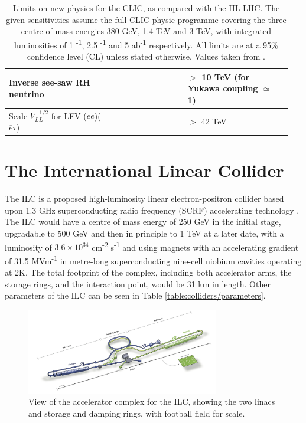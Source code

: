 \begin{table}[b]
\begin{tabular}{p{0.35\linewidth}  p{0.25\linewidth} p{0.35\linewidth}}
	Inverse see-saw RH neutrino &  & $>$ 10 TeV (for Yukawa coupling $\simeq$ 1) \\ \hline

	Scale $V^{-1/2}_{LL}$ for LFV ($\overline{e}e$)($\overline{e}\tau$) & & $>$ 42 TeV \\ \hline \hline
	\end{tabular}
	\caption{Limits on new physics for the \acrlong{CLIC}, as compared with the \acrfull{HL-LHC}. The given sensitivities assume the full \acrshort{CLIC} physic programme covering the three centre of mass energies 380 GeV, 1.4 TeV and 3 TeV, with integrated luminosities of 1 \textsuperscript{-1}, 2.5 \textsuperscript{-1} and 5 ab\textsuperscript{-1} respectively. All limits are at a 95\% confidence level (CL) unless stated otherwise. Values taken from \cite{clic-yellow}.}
	\label{table:colliders/precisions}
\end{table}


\section{The International Linear Collider}
The \acrfull{ILC} is a proposed high-luminosity linear electron-positron collider based upon 1.3 GHz superconducting radio frequency (\acrshort{SCRF}) accelerating technology \cite{ilc-tdr-summary}. The ILC would have a centre of mass energy of 250 GeV in the initial stage, upgradable to 500 GeV and then in principle to 1 TeV at a later date, with a luminosity of $3.6\times 10^{34}$ cm\textsuperscript{-2} s\textsuperscript{-1} and using magnets with an accelerating gradient of 31.5 MVm\textsuperscript{-1} in metre-long superconducting nine-cell niobium cavities operating at 2K. The total footprint of the complex, including both accelerator arms, the storage rings, and the interaction point, would be 31 km in length. Other parameters of the \acrshort{ILC} can be seen in Table \ref{table:colliders/parameters}.

\begin{figure}[h]
	\centering
	\includegraphics[width=0.75\textwidth]{../Pictures/ILC-Schematic.jpg}
	\caption{View of the accelerator complex for the \acrlong{ILC}, showing the two linacs and storage and damping rings, with football field for scale.}
	\label{figure:colliders/ILC/main}
\end{figure}

